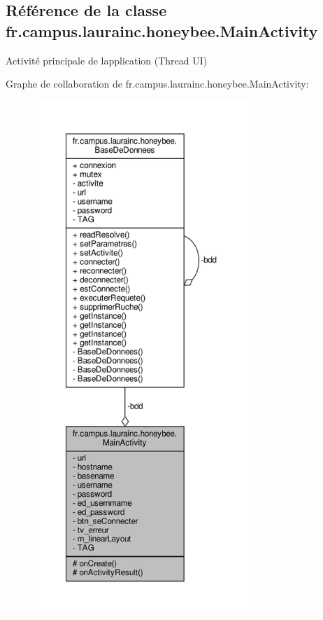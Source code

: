 \hypertarget{classfr_1_1campus_1_1laurainc_1_1honeybee_1_1_main_activity}{}\subsection{Référence de la classe fr.\+campus.\+laurainc.\+honeybee.\+Main\+Activity}
\label{classfr_1_1campus_1_1laurainc_1_1honeybee_1_1_main_activity}


Activité principale de l\textquotesingle{}application (Thread UI)  




Graphe de collaboration de fr.\+campus.\+laurainc.\+honeybee.\+Main\+Activity\+:\nopagebreak
\begin{figure}[H]
\begin{center}
\leavevmode
\includegraphics[height=550pt]{classfr_1_1campus_1_1laurainc_1_1honeybee_1_1_main_activity__coll__graph}
\end{center}
\end{figure}
